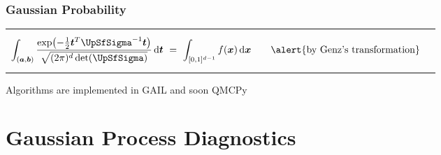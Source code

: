 \documentclass[10pt,compress,xcolor={usenames,dvipsnames},aspectratio=169]{beamer}
\newcommand{\talert}[1]{\alert{\text{#1}}}
\begin{document}
 
 \begin{frame}[label=GaussProb]
 	\frametitle{Gaussian Probability}
 	\vspace{-8ex}
 	\begin{tabular}{m{}m{3cm}}
 		\begin{equation*}
 		\int_{(\va,\vb)} \frac{\exp\bigl(- \frac 12 \vt^T \mSigma^{-1} \vt 
 			\bigr)}{\sqrt{(2 
 				\pi)^d \det(\mSigma)}} \, \dif \vt \
 		= \ \int_{[0,1]^{d-1}} 
 		f(\vx) \, 
 		\dif \vx \qquad \talert{by Genz's transformation}
 		\end{equation*}
 		& 
 	\end{tabular}
 	 	
 	\vspace{-4ex}
 	


 	\vspace{-2ex}
 	
 Algorithms are implemented in GAIL and soon QMCPy
 
 
 
\end{frame}


\section{Gaussian Process Diagnostics}
\end{document}
